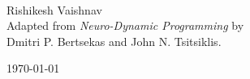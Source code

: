 \begin{titlepage}
\centering

{\LARGE {}}\\
\vspace{10pt}
\large 
Rishikesh Vaishnav\\ 
\vspace{10pt}
\normalsize 
Adapted from
{\it Neuro-Dynamic Programming}
by \\
Dmitri P. Bertsekas
and
John N. Tsitsiklis.
\vspace{10pt}

\today
\end{titlepage}

